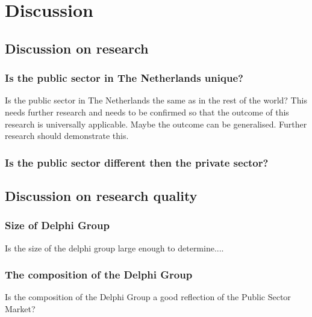 \chapter{Discussion}
\label{ch:discussion}


\section{Discussion on research}
\label{sec:discussiononresearch}


\subsection{Is the public sector in The Netherlands unique?}
\label{sub:discussionpublicsector}
Is the public sector in The Netherlands the same as in the rest of the world? This needs further research and needs to be confirmed so that the outcome of this research is universally applicable. Maybe the outcome can be generalised. Further research should demonstrate this.

\subsection{Is the public sector different then the private sector?}
\label{sub:discussionpublicvsprivate}
\lipsum[1]


\section{Discussion on research quality}
\label{sec:discusssionresearchquality}
\subsection{Size of Delphi Group}
\label{sub:discussionsizeofdelphi}
Is the size of the delphi group large enough to determine....
\subsection{The composition of the Delphi Group}
\label{sub:compositionofdelphi}
Is the composition of the Delphi Group a good reflection of the Public Sector Market?